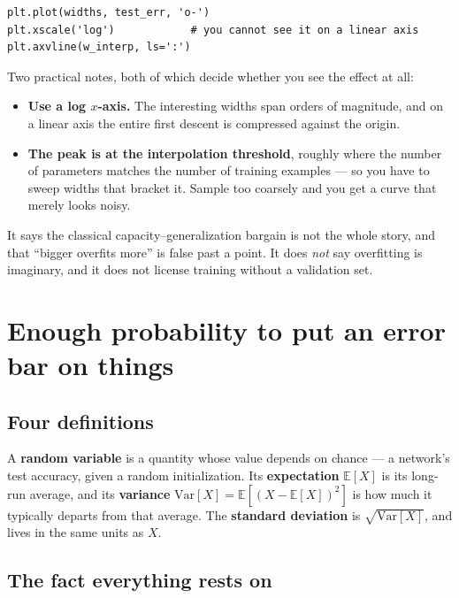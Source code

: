 \documentclass[11pt]{article}
\begin{document}
\begin{lstlisting}
plt.plot(widths, test_err, 'o-')
plt.xscale('log')            # you cannot see it on a linear axis
plt.axvline(w_interp, ls=':')
\end{lstlisting}

Two practical notes, both of which decide whether you see the effect at all:

\begin{itemize}
  \item \textbf{Use a log $x$-axis.} The interesting widths span orders of
        magnitude, and on a linear axis the entire first descent is compressed
        against the origin.
  \item \textbf{The peak is at the interpolation threshold}, roughly where the
        number of parameters matches the number of training examples --- so you
        have to sweep widths that bracket it. Sample too coarsely and you get a
        curve that merely looks noisy.
\end{itemize}

\begin{keybox}
 It says the classical
capacity--generalization bargain is not the whole story, and that ``bigger
overfits more'' is false past a point. It does \emph{not} say overfitting is
imaginary, and it does not license training without a validation set.
\end{keybox}

\section{Enough probability to put an error bar on things}

\subsection{Four definitions}

A \textbf{random variable} is a quantity whose value depends on chance --- a
network's test accuracy, given a random initialization. Its
\textbf{expectation} $\mathbb{E}[X]$ is its long-run average, and its
\textbf{variance} $\mathrm{Var}[X] = \mathbb{E}[(X - \mathbb{E}[X])^2]$ is how
much it typically departs from that average. The \textbf{standard deviation} is
$\sqrt{\mathrm{Var}[X]}$, and lives in the same units as $X$.

\subsection{The fact everything rests on}
\end{document}
